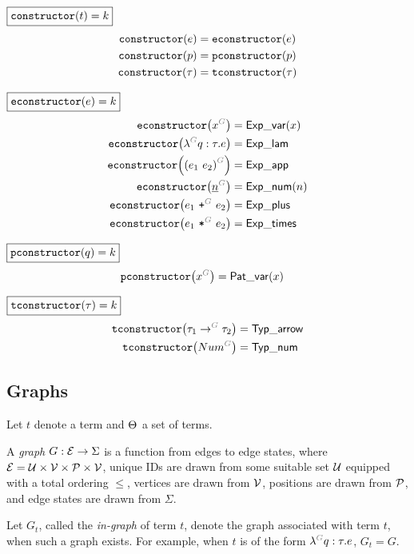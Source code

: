 \noindent $\boxed{\constructor{t} = k}$
%
\begin{align*}
  \constructor{e} &= \econstructor{e} \\
  \constructor{p} &= \pconstructor{p} \\
  \constructor{\tau} &= \tconstructor{\tau}
\end{align*}

\noindent $\boxed{\econstructor{e} = k}$
%
\begin{align*}
  \econstructor{\eVar{G}{x}} &= \ExpVar(x) \\
  \econstructor{\eFun{G}{q}{\tau}{e}} &= \ExpLam \\
  \econstructor{\eApp{G}{e_1}{e_2}} &= \ExpApp \\
  \econstructor{\eNum{G}{n}} &= \ExpNum(n) \\
  \econstructor{\ePlus{G}{e_1}{e_2}} &= \ExpPlus \\
  \econstructor{\eTimes{G}{e_1}{e_2}} &= \ExpTimes
\end{align*}

\noindent $\boxed{\pconstructor{q} = k}$
%
\begin{align*}
  \pconstructor{\pVar{G}{x}} &= \PatVar(x)
\end{align*}

\noindent $\boxed{\tconstructor{\tau} = k}$
%
\begin{align*}
  \tconstructor{\tArrow{G}{\tau_1}{\tau_2}} &= \TypArrow \\
  \tconstructor{\tNum{G}} &= \TypNum
\end{align*}


\subsection{Graphs}

Let $t$ denote a term and $\Set$ a set of terms.

\begin{definition}
  A \emph{graph} $G : \E \rightarrow \Sigma$ is a function from edges to edge states,
  where $\E = \U \times \V \times \P \times \V$,
  unique IDs are drawn from some suitable set $\U$ equipped with a total ordering $\leq$,
  vertices are drawn from $\V$,
  positions are drawn from $\P$,
  and edge states are drawn from $\Sigma$.
\end{definition}

Let $G_t$, called the \emph{in-graph} of term $t$,
denote the graph associated with term $t$, when such a graph exists.
For example, when $t$ is of the form $\eFun{G}{q}{\tau}{e}$, $G_t = G$.

